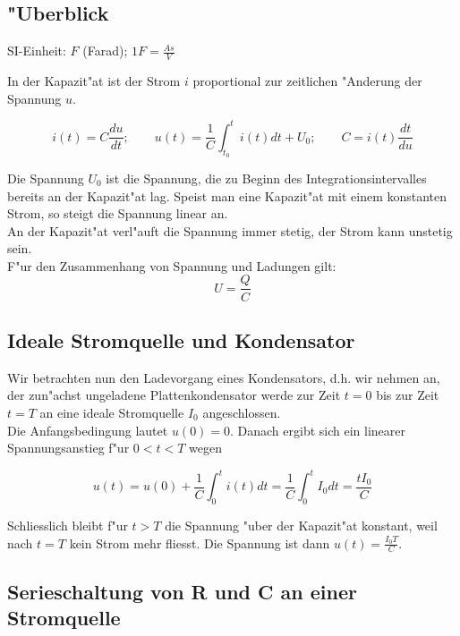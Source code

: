 \documentclass[german, 10pt, a4paper, headsepline]{scrreprt}
\theoremstyle{remark}
\begin{document}
\subsection{"Uberblick}

SI-Einheit: $F$ (Farad); $1F=\frac{As}{V}$\\

In der Kapazit"at ist der Strom $i$ proportional zur zeitlichen "Anderung der Spannung $u$.

\begin{displaymath}
	i(t)=C\frac{du}{dt};\qquad u(t)=\frac{1}{C}\int^{t}_{t_0} i(t) dt + U_0;\qquad C= i(t)\frac{dt}{du}
\end{displaymath}

Die Spannung $U_0$ ist die Spannung, die zu Beginn des Integrationsintervalles bereits an der Kapazit"at lag. Speist man eine Kapazit"at mit einem konstanten Strom, so steigt die Spannung linear an.\\

An der Kapazit"at verl"auft die Spannung immer stetig, der Strom kann unstetig sein.\\

F"ur den Zusammenhang von Spannung und Ladungen gilt:
\begin{displaymath}
	U= \frac{Q}{C}
\end{displaymath}

\subsection{Ideale Stromquelle und Kondensator}

Wir betrachten nun den Ladevorgang eines Kondensators, d.h. wir nehmen an, der zun"achst ungeladene Plattenkondensator werde zur Zeit $t=0$ bis zur Zeit $t=T$ an eine ideale Stromquelle $I_0$ angeschlossen.\\

Die Anfangsbedingung lautet $u(0)=0$. Danach ergibt sich ein linearer Spannungsanstieg f"ur $0<t<T$ wegen

\begin{displaymath}
	u(t) = u(0)+\frac{1}{C}\int^t_0 i(t)dt=\frac{1}{C}\int^t_0 I_0dt = \frac{tI_0}{C}
\end{displaymath}

Schliesslich bleibt f"ur $t>T$ die Spannung "uber der Kapazit"at konstant, weil nach $t=T$ kein Strom mehr fliesst. Die Spannung ist dann $u(t)=\frac{I_0T}{C}$.

\subsection{Serieschaltung von R und C an einer Stromquelle}
\end{document}
